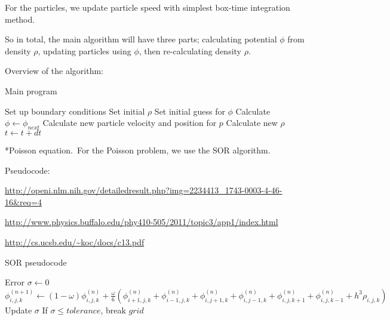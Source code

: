 \documentclass[titlepage, 11pt]{article}
\makeatletter
\renewcommand{\subsubsection}{\@startsection
        {subsubsection}
        {2}
        {0mm}
        {.5\baselineskip}
        {0mm}
        {\it\bfseries\normalsize}}
\makeatother
\begin{document}
For the particles, we update particle speed with simplest box-time integration method.

So in total, the main algorithm will have three parts; calculating potential $\phi$ 
from density $\rho$, updating particles using $\phi$, then re-calculating density 
$\rho$.

Overview of the algorithm:

\begin{algorithm}
 \label{alg:main}
 \caption{Main program}
 \begin{algorithmic}
  \State Set up boundary conditions
  \State Set initial $\rho$
  \State Set initial guess for $\phi$
  \Loop
   \State Calculate $\phi \gets \phi_{next}$
    \State Calculate new particle velocity and position for $p$
   \EndFor
   \State Calculate new $\rho$
   \State $t \gets t+dt$
  \EndLoop
 \end{algorithmic}

\end{algorithm}


\subsubsection*{Poisson equation.}\ For the Poisson problem, we use the SOR algorithm.

Pseudocode: 

\url{http://openi.nlm.nih.gov/detailedresult.php?img=2234413_1743-0003-4-46-16&req=4}

\url{http://www.physics.buffalo.edu/phy410-505/2011/topic3/app1/index.html}

\url{http://cs.ucsb.edu/~koc/docs/c13.pdf}

\begin{algorithm}
 \label{pseudo:SOR}
 \caption{SOR pseudocode}
\begin{algorithmic}[1]
   \State Error $\sigma \gets 0$
    \State $\phi_{i,j,k}^{(n+1)} \gets (1-\omega)\phi_{i,j,k}^{(n)} + \frac{\omega}{6} (\phi_{i+1,j,k}^{(n)} + \phi_{i-1,j,k}^{(n)} + \phi_{i,j+1,k}^{(n)} + \phi_{i,j-1,k}^{(n)} + \phi_{i,j,k+1}^{(n)} + \phi_{i,j,k-1}^{(n)} + h^3\rho_{i,j,k})$
    \State Update $\sigma$
   \EndFor
   \State If $\sigma \leq tolerance$, break
  \EndFor
  \State \Return $grid$
 \EndFunction
\end{algorithmic}
\end{algorithm}
\end{document}
